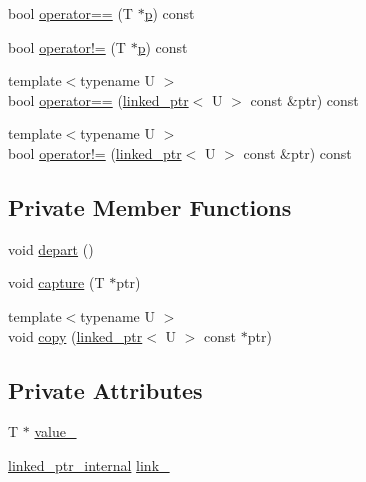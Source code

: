 \begin{DoxyCompactItemize}
\item 
bool \mbox{\hyperlink{classtesting_1_1internal_1_1linked__ptr_ad87ac8ff5543b6fad66e2f3c9844581a}{operator==}} (T $\ast$\mbox{\hyperlink{_obj__test_2lib_2googletest-master_2googlemock_2test_2gmock-matchers__test_8cc_a6bc6b007533335efe02bafff799ec64c}{p}}) const
\item 
bool \mbox{\hyperlink{classtesting_1_1internal_1_1linked__ptr_a10305395af92bd2fec7bca085cabc99c}{operator!=}} (T $\ast$\mbox{\hyperlink{_obj__test_2lib_2googletest-master_2googlemock_2test_2gmock-matchers__test_8cc_a6bc6b007533335efe02bafff799ec64c}{p}}) const
\item 
{\footnotesize template$<$typename U $>$ }\\bool \mbox{\hyperlink{classtesting_1_1internal_1_1linked__ptr_a79306e959a4ae7b3a9da641d2ba06ce6}{operator==}} (\mbox{\hyperlink{classtesting_1_1internal_1_1linked__ptr}{linked\+\_\+ptr}}$<$ U $>$ const \&ptr) const
\item 
{\footnotesize template$<$typename U $>$ }\\bool \mbox{\hyperlink{classtesting_1_1internal_1_1linked__ptr_a4801114a83a9e12b08f90e0d28318f26}{operator!=}} (\mbox{\hyperlink{classtesting_1_1internal_1_1linked__ptr}{linked\+\_\+ptr}}$<$ U $>$ const \&ptr) const
\end{DoxyCompactItemize}
\subsection*{Private Member Functions}
\begin{DoxyCompactItemize}
\item 
void \mbox{\hyperlink{classtesting_1_1internal_1_1linked__ptr_a0852ab20839140f29b2ad074339fccc7}{depart}} ()
\item 
void \mbox{\hyperlink{classtesting_1_1internal_1_1linked__ptr_a0b4623795339fd29bf9303f926ae2824}{capture}} (T $\ast$ptr)
\item 
{\footnotesize template$<$typename U $>$ }\\void \mbox{\hyperlink{classtesting_1_1internal_1_1linked__ptr_aea2859970b65708fc4f7c8c4cbc7928a}{copy}} (\mbox{\hyperlink{classtesting_1_1internal_1_1linked__ptr}{linked\+\_\+ptr}}$<$ U $>$ const $\ast$ptr)
\end{DoxyCompactItemize}
\subsection*{Private Attributes}
\begin{DoxyCompactItemize}
\item 
T $\ast$ \mbox{\hyperlink{classtesting_1_1internal_1_1linked__ptr_abb52c4e944fc7a24a4ec7788b612fb37}{value\+\_\+}}
\item 
\mbox{\hyperlink{classtesting_1_1internal_1_1linked__ptr__internal}{linked\+\_\+ptr\+\_\+internal}} \mbox{\hyperlink{classtesting_1_1internal_1_1linked__ptr_a8fdfa75fea8bfc10825a3cc53c50461f}{link\+\_\+}}
\end{DoxyCompactItemize}
